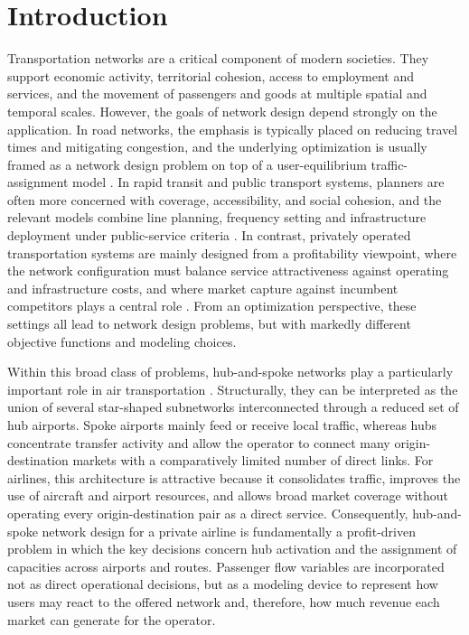\section{Introduction}
Transportation networks are a critical component of modern societies. They support economic activity, territorial cohesion, access to employment and services, and the movement of passengers and goods at multiple spatial and temporal scales. However, the goals of network design depend strongly on the application. In road networks, the emphasis is typically placed on reducing travel times and mitigating congestion, and the underlying optimization is usually framed as a network design problem on top of a user-equilibrium traffic-assignment model \cite{Sheffi1985,YangBell1998,MagnantiWong1984}. In rapid transit and public transport systems, planners are often more concerned with coverage, accessibility, and social cohesion, and the relevant models combine line planning, frequency setting and infrastructure deployment under public-service criteria \cite{GuihaireHao2008,LaporteMesaOrtegaPerea2011,RealRojas2026TRB}. In contrast, privately operated transportation systems are mainly designed from a profitability viewpoint, where the network configuration must balance service attractiveness against operating and infrastructure costs, and where market capture against incumbent competitors plays a central role \cite{AdlerSmilowitz2007,BelobabaOdoniBarnhart2015}. From an optimization perspective, these settings all lead to network design problems, but with markedly different objective functions and modeling choices.

Within this broad class of problems, hub-and-spoke networks play a particularly important role in air transportation \cite{OKelly1987,Campbell1994Integer,AdlerSmilowitz2007,BelobabaOdoniBarnhart2015}. Structurally, they can be interpreted as the union of several star-shaped subnetworks interconnected through a reduced set of hub airports. Spoke airports mainly feed or receive local traffic, whereas hubs concentrate transfer activity and allow the operator to connect many origin-destination markets with a comparatively limited number of direct links. For airlines, this architecture is attractive because it consolidates traffic, improves the use of aircraft and airport resources, and allows broad market coverage without operating every origin-destination pair as a direct service. Consequently, hub-and-spoke network design for a private airline is fundamentally a profit-driven problem in which the key decisions concern hub activation and the assignment of capacities across airports and routes. Passenger flow variables are incorporated not as direct operational decisions, but as a modeling device to represent how users may react to the offered network and, therefore, how much revenue each market can generate for the operator.

